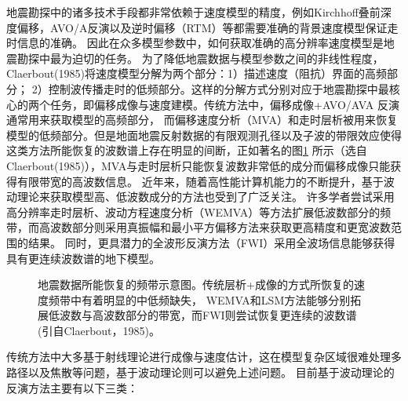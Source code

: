 地震勘探中的诸多技术手段都非常依赖于速度模型的精度，例如Kirchhoff叠前深度偏移，AVO/A反演以及逆时偏移（RTM）等都需要准确的背景速度模型保证走时信息的准确。
因此在众多模型参数中，如何获取准确的高分辨率速度模型是地震勘探中最为迫切的任务。
为了降低地震数据与模型参数之间的非线性程度，Claerbout(1985)\cite{Claerbout1985Imaging}将速度模型分解为两个部分：1）描述速度（阻抗）界面的高频部分；
2）控制波传播走时的低频部分。这样的分解方式分别对应于地震勘探中最核心的两个任务，即偏移成像与速度建模。传统方法中，偏移成像+AVO/AVA
反演通常用来获取模型的高频部分，
而偏移速度分析（MVA）和走时层析被用来恢复模型的低频部分。但是地面地震反射数据的有限观测孔径以及子波的带限效应使得
这类方法所能恢复的波数谱上存在明显的间断，正如著名的图\ref{fig:GapInSeisVel}
所示（选自Claerbout(1985)\cite{Claerbout1985Imaging}），MVA与走时层析只能恢复波数非常低的成分而偏移成像只能获得有限带宽的高波数信息。
近年来，随着高性能计算机能力的不断提升，基于波动理论来获取模型高、低波数成分的方法也受到了广泛关注。
许多学者尝试采用高分辨率走时层析、波动方程速度分析（WEMVA）等方法扩展低波数部分的频带，而高波数部分则采用真振幅和最小平方偏移方法来获取更高精度和更宽波数范围的结果。
同时，更具潜力的全波形反演方法（FWI）采用全波场信息能够获得具有更连续波数谱的地下模型。
\begin{figure}[!htb] 
   \centering 
   \caption{地震数据所能恢复的频带示意图。传统层析+成像的方式所恢复的速度频带中有着明显的中低频缺失，
	   WEMVA和LSM方法能够分别拓展低波数与高波数部分的带宽，而FWI则尝试恢复更连续的波数谱(引自Claerbout，1985\cite{Claerbout1985Imaging})。}
   \label{fig:GapInSeisVel}
\end{figure}

传统方法中大多基于射线理论进行成像与速度估计，这在模型复杂区域很难处理多路径以及焦散等问题，基于波动理论则可以避免上述问题。
目前基于波动理论的反演方法主要有以下三类：

